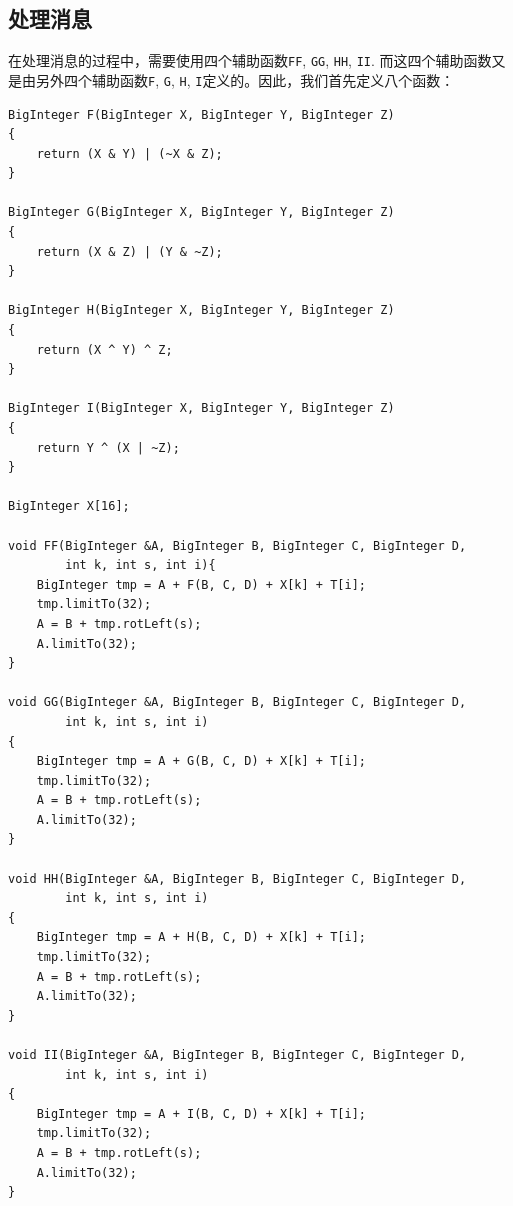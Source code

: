 \subsection{处理消息}
在处理消息的过程中，需要使用四个辅助函数\verb`FF`, \verb`GG`, \verb`HH`, \verb`II`. 而这四个辅助函数又是由另外四个辅助函数\verb`F`, \verb`G`, \verb`H`, \verb`I`定义的。因此，我们首先定义八个函数：
\begin{prove}
\begin{verbatim}
BigInteger F(BigInteger X, BigInteger Y, BigInteger Z)
{
    return (X & Y) | (~X & Z);
}

BigInteger G(BigInteger X, BigInteger Y, BigInteger Z)
{
    return (X & Z) | (Y & ~Z);
}

BigInteger H(BigInteger X, BigInteger Y, BigInteger Z)
{
    return (X ^ Y) ^ Z;
}

BigInteger I(BigInteger X, BigInteger Y, BigInteger Z)
{
    return Y ^ (X | ~Z);
}

BigInteger X[16];

void FF(BigInteger &A, BigInteger B, BigInteger C, BigInteger D, 
        int k, int s, int i){
    BigInteger tmp = A + F(B, C, D) + X[k] + T[i];
    tmp.limitTo(32);
    A = B + tmp.rotLeft(s);
    A.limitTo(32);
}

void GG(BigInteger &A, BigInteger B, BigInteger C, BigInteger D, 
        int k, int s, int i)
{
    BigInteger tmp = A + G(B, C, D) + X[k] + T[i];
    tmp.limitTo(32);
    A = B + tmp.rotLeft(s);
    A.limitTo(32);
}

void HH(BigInteger &A, BigInteger B, BigInteger C, BigInteger D, 
        int k, int s, int i)
{
    BigInteger tmp = A + H(B, C, D) + X[k] + T[i];
    tmp.limitTo(32);
    A = B + tmp.rotLeft(s);
    A.limitTo(32);
}

void II(BigInteger &A, BigInteger B, BigInteger C, BigInteger D, 
        int k, int s, int i)
{
    BigInteger tmp = A + I(B, C, D) + X[k] + T[i];
    tmp.limitTo(32);
    A = B + tmp.rotLeft(s);
    A.limitTo(32);
}
\end{verbatim}
\end{prove}

